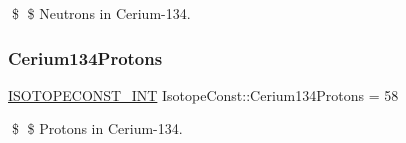 \$ \$ Neutrons in Cerium-\/134. \mbox{\label{group___isotope_const-_cerium-_ce134_ga093f95422ee405de7e2da9451766e328}} 
\subsubsection{\texorpdfstring{Cerium134\+Protons}{Cerium134Protons}}
{\footnotesize\ttfamily \mbox{\hyperlink{group___isotope_const-_macros_ga5f18360b3e99483a35c32d789e62621c}{I\+S\+O\+T\+O\+P\+E\+C\+O\+N\+S\+T\+\_\+\+I\+NT}} Isotope\+Const\+::\+Cerium134\+Protons = 58}

\$ \$ Protons in Cerium-\/134. 